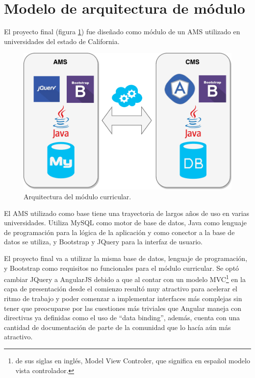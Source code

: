 \section{Modelo de arquitectura de módulo}

El proyecto final (figura \ref{arquitectura}) fue diseñado como módulo de un AMS utilizado en universidades del estado de California.

\begin{figure}[]
\centering
\includegraphics[scale=0.6]{Capitulos/PropuestadeSolucion/Imagenes/arquitectura}
\caption{Arquitectura del módulo curricular.}
  \label{arquitectura}
\end{figure}

El AMS utilizado como base tiene una trayectoria de largos años de uso en varias universidades. Utiliza MySQL como motor de base de datos, Java como lenguaje de programación para la lógica de la aplicación y como conector a la base de datos se utiliza, y Bootstrap y JQuery para la interfaz de usuario. 

El proyecto final va a utilizar la misma base de datos, lenguaje de programación, y Bootstrap como requisitos no funcionales para el módulo curricular. Se optó cambiar JQuery a AngularJS debido a que al contar con un modelo MVC\footnote{de sus siglas en inglés, Model View Controler, que significa en español modelo vista controlador.} en la capa de presentación desde el comienzo resultó muy atractivo para acelerar el ritmo de trabajo y poder comenzar a implementar interfaces más complejas sin tener que preocuparse por las cuestiones más triviales que Angular maneja con directivas ya definidas como el uso de \enquote{data binding}, además, cuenta con una cantidad de documentación de parte de la comunidad que lo hacía aún más atractivo.